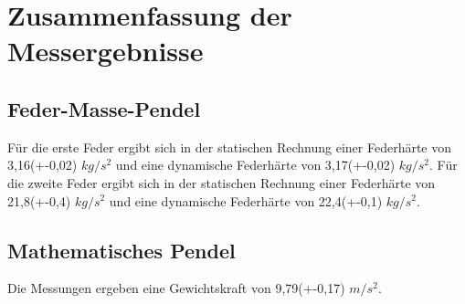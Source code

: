 \section{Zusammenfassung der Messergebnisse}
\subsection{Feder-Masse-Pendel}
Für die erste Feder ergibt sich in der statischen Rechnung einer Federhärte von 3,16(+-0,02) $kg/s^{2}$ und eine dynamische Federhärte von 3,17(+-0,02) $kg/s^{2}$.
\newline
\newline
Für die zweite Feder ergibt sich in der statischen Rechnung einer Federhärte von 21,8(+-0,4) $kg/s^{2}$ und eine dynamische Federhärte von 22,4(+-0,1) $kg/s^{2}$.
\subsection{Mathematisches Pendel}
Die Messungen ergeben eine Gewichtskraft von 9,79(+-0,17) $m/s^{2}$.